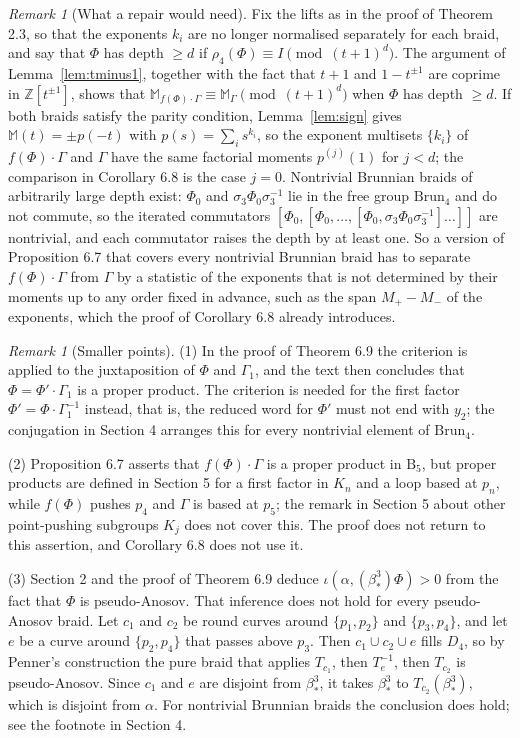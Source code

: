 \documentclass[11pt]{amsart}
\theoremstyle{remark}
\newtheorem{remark}[lemma]{Remark}
\newcommand{\M}{\mathbb{M}}
\newcommand{\B}{\mathrm{B}}
\newcommand{\Brun}{\mathrm{Brun}}
\newcommand{\bs}{\beta^3_*}
\begin{document}
\begin{remark}[What a repair would need]
Fix the lifts as in the proof of Theorem 2.3, so that the exponents $k_i$ are no longer normalised separately for each braid, and say that $\Phi$ has depth $\ge d$ if $\rho_4(\Phi)\equiv I\pmod{(t+1)^d}$. The argument of Lemma~\ref{lem:tminus1}, together with the fact that $t+1$ and $1-t^{\pm1}$ are coprime in $\mathbb{Z}[t^{\pm1}]$, shows that $\M_{f(\Phi)\cdot\Gamma}\equiv\M_\Gamma\pmod{(t+1)^d}$ when $\Phi$ has depth $\ge d$. If both braids satisfy the parity condition, Lemma~\ref{lem:sign} gives $\M(t)=\pm p(-t)$ with $p(s)=\sum_i s^{k_i}$, so the exponent multisets $\{k_i\}$ of $f(\Phi)\cdot\Gamma$ and $\Gamma$ have the same factorial moments $p^{(j)}(1)$ for $j<d$; the comparison in Corollary 6.8 is the case $j=0$. Nontrivial Brunnian braids of arbitrarily large depth exist: $\Phi_0$ and $\sigma_3\Phi_0\sigma_3^{-1}$ lie in the free group $\Brun_4$ and do not commute, so the iterated commutators $[\Phi_0,[\Phi_0,\dots,[\Phi_0,\sigma_3\Phi_0\sigma_3^{-1}]\dots]]$ are nontrivial, and each commutator raises the depth by at least one. So a version of Proposition 6.7 that covers every nontrivial Brunnian braid has to separate $f(\Phi)\cdot\Gamma$ from $\Gamma$ by a statistic of the exponents that is not determined by their moments up to any order fixed in advance, such as the span $M_+-M_-$ of the exponents, which the proof of Corollary 6.8 already introduces.
\end{remark}

\begin{remark}[Smaller points]\label{rem:small}
(1) In the proof of Theorem 6.9 the criterion is applied to the juxtaposition of $\Phi$ and $\Gamma_1$, and the text then concludes that $\Phi=\Phi'\cdot\Gamma_1$ is a proper product. The criterion is needed for the first factor $\Phi'=\Phi\cdot\Gamma_1^{-1}$ instead, that is, the reduced word for $\Phi'$ must not end with $y_2$; the conjugation in Section 4 arranges this for every nontrivial element of $\Brun_4$.

(2) Proposition 6.7 asserts that $f(\Phi)\cdot\Gamma$ is a proper product in $\B_5$, but proper products are defined in Section 5 for a first factor in $K_n$ and a loop based at $p_n$, while $f(\Phi)$ pushes $p_4$ and $\Gamma$ is based at $p_5$; the remark in Section 5 about other point-pushing subgroups $K_j$ does not cover this. The proof does not return to this assertion, and Corollary 6.8 does not use it.

(3) Section 2 and the proof of Theorem 6.9 deduce $\iota(\alpha,(\bs)\Phi)>0$ from the fact that $\Phi$ is pseudo-Anosov. That inference does not hold for every pseudo-Anosov braid. Let $c_1$ and $c_2$ be round curves around $\{p_1,p_2\}$ and $\{p_3,p_4\}$, and let $e$ be a curve around $\{p_2,p_4\}$ that passes above $p_3$. Then $c_1\cup c_2\cup e$ fills $D_4$, so by Penner's construction \cite{Pen} the pure braid that applies $T_{c_1}$, then $T_e^{-1}$, then $T_{c_2}$ is pseudo-Anosov. Since $c_1$ and $e$ are disjoint from $\bs$, it takes $\bs$ to $T_{c_2}(\bs)$, which is disjoint from $\alpha$. For nontrivial Brunnian braids the conclusion does hold; see the footnote in Section 4.
\end{remark}
\end{document}
